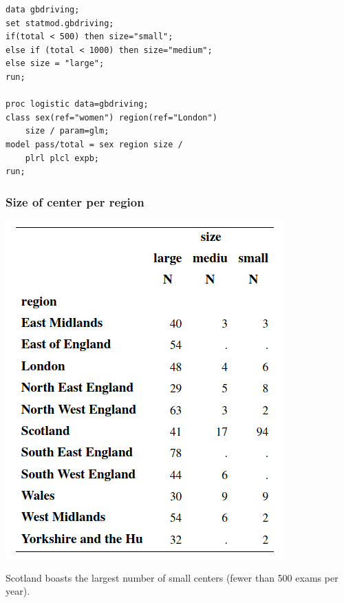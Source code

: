 \documentclass{beamer}
\begin{document}
\begin{frame}[fragile]

\begin{tcolorbox}[colback=white, colframe=hecblue, title=SAS code to fit a logistic regression for binomial data]
\begin{verbatim}
data gbdriving;
set statmod.gbdriving;
if(total < 500) then size="small";
else if (total < 1000) then size="medium";
else size = "large";
run;

proc logistic data=gbdriving;
class sex(ref="women") region(ref="London") 
    size / param=glm;
model pass/total = sex region size / 
    plrl plcl expb;
run;
\end{verbatim}
\end{tcolorbox}
\end{frame}
\begin{frame}
 \frametitle{Size of center per region}
 \begin{center}
  \includegraphics[width = 0.4\linewidth]{img/c4/slides8-e23}
 \end{center}
{ \small Scotland boasts the largest number of small centers (fewer than 500 exams per year).


}
\end{frame}
\end{document}
